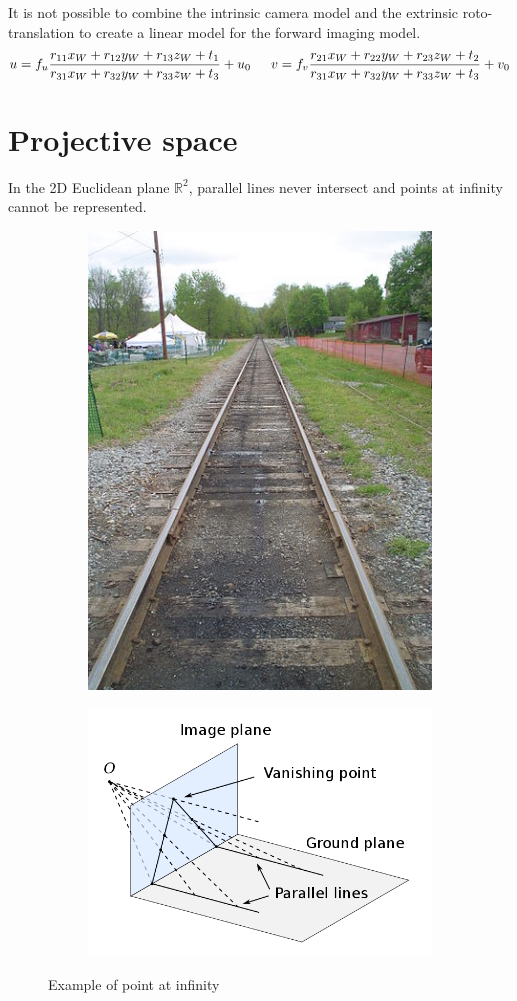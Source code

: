 \begin{remark}
    It is not possible to combine the intrinsic camera model and the extrinsic roto-translation to
    create a linear model for the forward imaging model.
    \[
        u = f_u \frac{r_{11}x_W + r_{12}y_W + r_{13}z_W + t_1}{r_{31}x_W + r_{32}y_W + r_{33}z_W + t_3} + u_0
        \hspace{1.5em}
        v = f_v \frac{r_{21}x_W + r_{22}y_W + r_{23}z_W + t_2}{r_{31}x_W + r_{32}y_W + r_{33}z_W + t_3} + v_0
    \]
\end{remark}



\section{Projective space}

\begin{remark}
    In the 2D Euclidean plane $\mathbb{R}^2$, parallel lines never intersect and points at infinity cannot be represented.
    \begin{figure}[H]
        \centering
        \begin{subfigure}{0.45\linewidth}
            \centering
            \includegraphics[width=0.45\linewidth]{./img/point_infinity_example1.png}
        \end{subfigure}
        \begin{subfigure}{0.45\linewidth}
            \centering
            \includegraphics[width=0.8\linewidth]{./img/point_infinity_example2.png}
        \end{subfigure}
        \caption{Example of point at infinity}
    \end{figure}
\end{remark}


